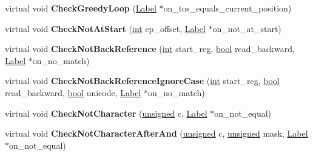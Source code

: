 \begin{DoxyCompactItemize}
\item 
\mbox{\label{classv8_1_1internal_1_1RegExpMacroAssemblerARM64_a78b86fb0cc69f34cccc84b776eeb6b8a}} 
virtual void {\bfseries Check\+Greedy\+Loop} (\mbox{\hyperlink{classv8_1_1internal_1_1Label}{Label}} $\ast$on\+\_\+tos\+\_\+equals\+\_\+current\+\_\+position)
\item 
\mbox{\label{classv8_1_1internal_1_1RegExpMacroAssemblerARM64_a15a4ce2aad4da4d8c7892ec1ba908a11}} 
virtual void {\bfseries Check\+Not\+At\+Start} (\mbox{\hyperlink{classint}{int}} cp\+\_\+offset, \mbox{\hyperlink{classv8_1_1internal_1_1Label}{Label}} $\ast$on\+\_\+not\+\_\+at\+\_\+start)
\item 
\mbox{\label{classv8_1_1internal_1_1RegExpMacroAssemblerARM64_a4541bbaffaebe67fe3e140ec6f629a1c}} 
virtual void {\bfseries Check\+Not\+Back\+Reference} (\mbox{\hyperlink{classint}{int}} start\+\_\+reg, \mbox{\hyperlink{classbool}{bool}} read\+\_\+backward, \mbox{\hyperlink{classv8_1_1internal_1_1Label}{Label}} $\ast$on\+\_\+no\+\_\+match)
\item 
\mbox{\label{classv8_1_1internal_1_1RegExpMacroAssemblerARM64_a708f47b12068cff72e38264211aee036}} 
virtual void {\bfseries Check\+Not\+Back\+Reference\+Ignore\+Case} (\mbox{\hyperlink{classint}{int}} start\+\_\+reg, \mbox{\hyperlink{classbool}{bool}} read\+\_\+backward, \mbox{\hyperlink{classbool}{bool}} unicode, \mbox{\hyperlink{classv8_1_1internal_1_1Label}{Label}} $\ast$on\+\_\+no\+\_\+match)
\item 
\mbox{\label{classv8_1_1internal_1_1RegExpMacroAssemblerARM64_ae6adab3836146980b70e883babe42ec6}} 
virtual void {\bfseries Check\+Not\+Character} (\mbox{\hyperlink{classunsigned}{unsigned}} c, \mbox{\hyperlink{classv8_1_1internal_1_1Label}{Label}} $\ast$on\+\_\+not\+\_\+equal)
\item 
\mbox{\label{classv8_1_1internal_1_1RegExpMacroAssemblerARM64_a066c4128055d23a27c84c4fe647636b2}} 
virtual void {\bfseries Check\+Not\+Character\+After\+And} (\mbox{\hyperlink{classunsigned}{unsigned}} c, \mbox{\hyperlink{classunsigned}{unsigned}} mask, \mbox{\hyperlink{classv8_1_1internal_1_1Label}{Label}} $\ast$on\+\_\+not\+\_\+equal)

\end{DoxyCompactItemize}
